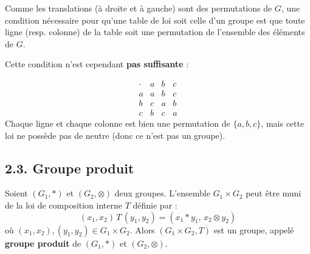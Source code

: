 \documentclass[a4paper,11pt]{article}
\newcommand{\mot}[1]{\textcolor{bordeaux}{\textbf{#1}}}
\begin{document}
Comme les translations (à droite et à gauche) sont des permutations de $G$, une condition nécessaire pour qu'une table de loi soit celle d'un groupe est que toute ligne (resp. colonne) de la table soit une permutation de l'ensemble des éléments de $G$.

Cette condition n'est cependant \mot{pas suffisante} :

\begin{exemples}
\[
\begin{array}{c|ccc}
\cdot & a & b & c \\
\hline
a & a & b & c \\
b & c & a & b \\
c & b & c & a
\end{array}
\]
Chaque ligne et chaque colonne est bien une permutation de $\{a, b, c\}$, mais cette loi ne possède pas de neutre (donc ce n'est pas un groupe).
\end{exemples}

\newpage
\subsection{2.3. Groupe produit}

\begin{proposition}
Soient $(G_1, *)$ et $(G_2, \otimes)$ deux groupes. L'ensemble $G_1 \times G_2$ peut être muni de la loi de composition interne $T$ définie par :
\[
(x_1, x_2) \, T \, (y_1, y_2) = (x_1 * y_1, \, x_2 \otimes y_2)
\]
où $(x_1, x_2), (y_1, y_2) \in G_1 \times G_2$.
Alors $(G_1 \times G_2, T)$ est un groupe, appelé \mot{groupe produit} de $(G_1, *)$ et $(G_2, \otimes)$.
\end{proposition}
\end{document}

